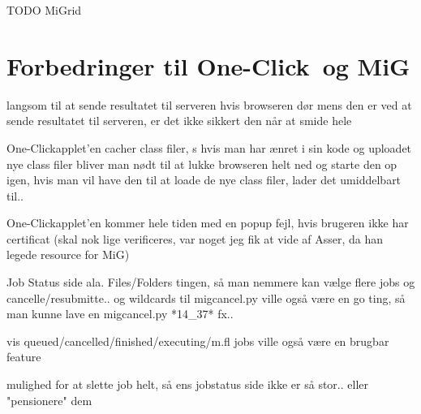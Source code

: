 \documentclass[pdf,draft,a4paper,10pt]{article}
\newcommand{\mig}{MiG}
\newcommand{\oc}{One-Click}
\begin{document}


TODO MiGrid
\section{Forbedringer til \oc\ og \mig}
%
langsom til at sende resultatet til serveren hvis browseren dør mens den er ved
at sende resultatet til serveren, er det ikke sikkert den når at smide hele

\oc applet'en cacher class filer, s hvis man har ænret i sin kode og
uploadet nye class filer bliver man nødt til at lukke browseren helt ned og
starte den op igen, hvis man vil have den til at loade de nye class filer, lader
det umiddelbart til.. 

\oc applet'en kommer hele tiden med en popup fejl, hvis brugeren ikke har
certificat (skal nok lige verificeres, var noget jeg fik at vide af Asser, da
han legede resource for \mig)

Job Status side ala. Files/Folders
tingen, så man nemmere kan vælge flere jobs og cancelle/resubmitte.. og
wildcards til migcancel.py ville også være en go ting, så man kunne lave en
migcancel.py *14\_37* fx.. 

vis queued/cancelled/finished/executing/m.fl jobs ville også være en brugbar feature

mulighed for at slette job helt, så ens jobstatus side ikke er så stor.. eller
"pensionere" dem
\end{document}
